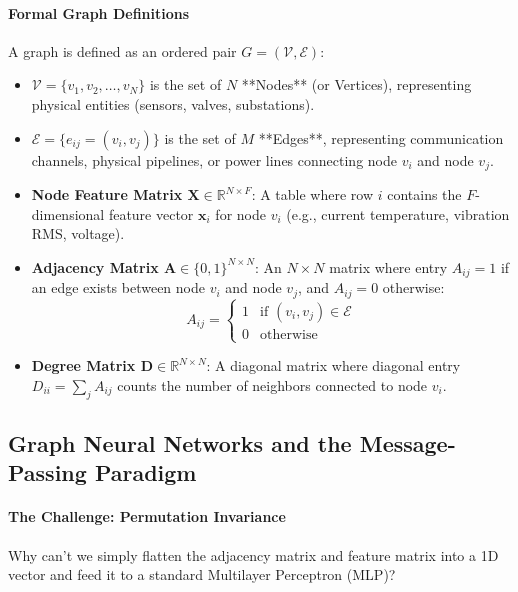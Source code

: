 \paragraph{Formal Graph Definitions}
A graph is defined as an ordered pair $G = (\mathcal{V}, \mathcal{E})$:
\begin{itemize}
    \item $\mathcal{V} = \{v_1, v_2, \dots, v_N\}$ is the set of $N$ **Nodes** (or Vertices), representing physical entities (sensors, valves, substations).
    \item $\mathcal{E} = \{e_{ij} = (v_i, v_j)\}$ is the set of $M$ **Edges**, representing communication channels, physical pipelines, or power lines connecting node $v_i$ and node $v_j$.
    \item \textbf{Node Feature Matrix $\mathbf{X} \in \mathbb{R}^{N \times F}$}: A table where row $i$ contains the $F$-dimensional feature vector $\mathbf{x}_i$ for node $v_i$ (e.g., current temperature, vibration RMS, voltage).
    \item \textbf{Adjacency Matrix $\mathbf{A} \in \{0, 1\}^{N \times N}$}: An $N \times N$ matrix where entry $A_{ij} = 1$ if an edge exists between node $v_i$ and node $v_j$, and $A_{ij} = 0$ otherwise:
    \begin{equation}
    A_{ij} = \begin{cases} 1 & \text{if } (v_i, v_j) \in \mathcal{E} \\ 0 & \text{otherwise} \end{cases}\label{eq:adjacency}
    \end{equation}
    \item \textbf{Degree Matrix $\mathbf{D} \in \mathbb{R}^{N \times N}$}: A diagonal matrix where diagonal entry $D_{ii} = \sum_{j} A_{ij}$ counts the number of neighbors connected to node $v_i$.
\end{itemize}

\subsection{Graph Neural Networks and the Message-Passing Paradigm}\label{subsec:gnn_message_passing}

\paragraph{The Challenge: Permutation Invariance}
Why can't we simply flatten the adjacency matrix and feature matrix into a 1D vector and feed it to a standard Multilayer Perceptron (MLP)? 

